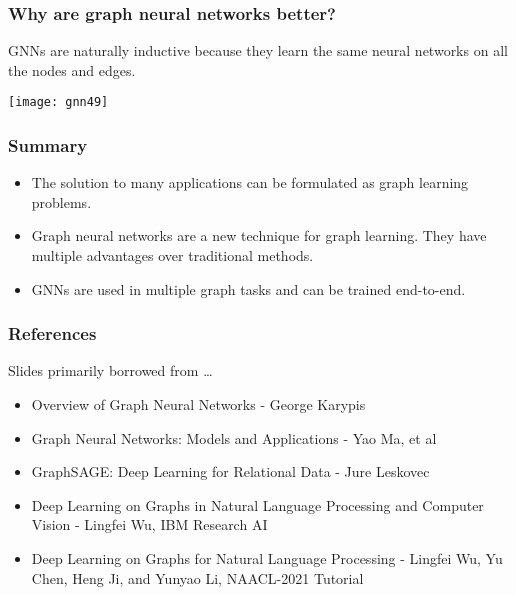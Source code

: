 \begin{frame}[fragile]\frametitle{Why are graph neural networks better?}

GNNs are naturally inductive because they learn the same neural networks on all the nodes and edges.


\begin{center}
\texttt{[image: gnn49]}
\end{center}	  

\end{frame}

\begin{frame}[fragile]\frametitle{Summary}

\begin{itemize}
\item The solution to many applications can be formulated as graph learning problems.
\item Graph neural networks are a new technique for graph learning. They have multiple advantages over traditional methods.
\item GNNs are used in multiple graph tasks and can be trained end-to-end.
\end{itemize}

\end{frame}

\begin{frame}[fragile]\frametitle{References}
Slides primarily borrowed from \ldots

\begin{itemize}
\item Overview of Graph Neural Networks - George Karypis
\item Graph Neural Networks: Models and Applications - Yao Ma, et al
\item GraphSAGE: Deep Learning for Relational Data - Jure Leskovec
\item Deep Learning on Graphs in Natural Language Processing and Computer Vision - Lingfei Wu, IBM Research AI
\item Deep Learning on Graphs for Natural Language Processing - Lingfei Wu, Yu Chen, Heng Ji, and Yunyao Li, NAACL-2021 Tutorial

\end{itemize}

\end{frame}
